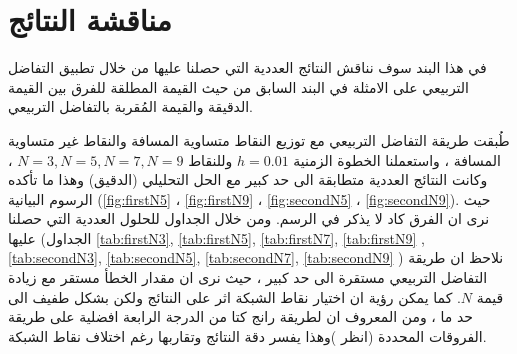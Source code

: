 \section{مناقشة النتائج}
في هذا البند سوف نناقش النتائج العددية التي حصلنا عليها من خلال تطبيق التفاضل التربيعي على الامثلة في البند السابق من حيث القيمة المطلقة للفرق بين القيمة الدقيقة والقيمة المُقربة بالتفاضل التربيعي. 

طُبقت طريقة التفاضل التربيعي مع توزيع النقاط متساوية المسافة والنقاط غير متساوية المسافة ، واستعملنا الخطوة الزمنية  $h=0.01$ وللنقاط $N=3, N=5, N=7, N=9$ ، وكانت النتائج العددية متطابقة الى حد كبير مع الحل التحليلي (الدقيق) وهذا ما تأكده الرسوم البيانية (\ref{fig:firstN5} ، \ref{fig:firstN9} ، \ref{fig:secondN5} ، \ref{fig:secondN9}). حيث نرى ان الفرق كاد لا يذكر في الرسم. ومن خلال الجداول للحلول العددية التي حصلنا عليها (الجداول
\ref{tab:firstN3}, \ref{tab:firstN5}, \ref{tab:firstN7}, \ref{tab:firstN9}
, \ref{tab:secondN3}, \ref{tab:secondN5}, \ref{tab:secondN7}, \ref{tab:secondN9}
)
نلاحظ ان طريقة التفاضل التربيعي مستقرة الى حد كبير ، حيث نرى ان مقدار الخطأ مستقر مع زيادة قيمة $N$. كما يمكن رؤية ان اختيار نقاط الشبكة اثر على النتائج ولكن بشكل طفيف الى حد ما ، ومن المعروف ان لطريقة رانج كتا من الدرجة الرابعة افضلية على طريقة الفروقات المحددة (انظر \cite{finite_difference})وهذا يفسر دقة النتائج وتقاربها رغم اختلاف نقاط الشبكة.


